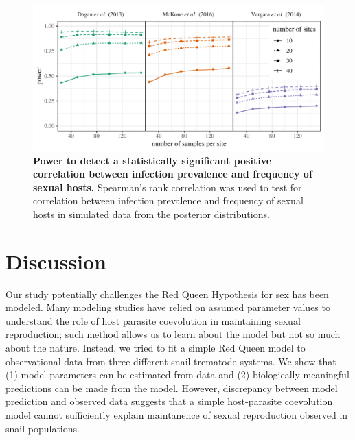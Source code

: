 \documentclass{article}\usepackage[]{graphicx}\usepackage[]{color}
\begin{document}
\begin{figure}[!ht]
\includegraphics[width=\textwidth]{../fig/power.pdf}
\caption{{\bf Power to detect a statistically significant positive correlation between infection prevalence and frequency of sexual hosts.}
Spearman's rank correlation was used to test for correlation between infection prevalence and frequency of sexual hosts in simulated data from the posterior distributions.
}
\label{fig:power}
\end{figure}

\section{Discussion}

Our study potentially challenges the Red Queen Hypothesis for sex has been modeled.
Many modeling studies have relied on assumed parameter values to understand the role of host parasite coevolution in maintaining sexual reproduction; 
such method allows us to learn about the model but not so much about the nature.
Instead, we tried to fit a simple Red Queen model to observational data from three different snail trematode systems.
We show that (1) model parameters can be estimated from data and (2) biologically meaningful predictions can be made from the model.
However, discrepancy between model prediction and observed data suggests that a simple host-parasite coevolution model cannot sufficiently explain maintanence of sexual reproduction observed in snail populations.
\end{document}
